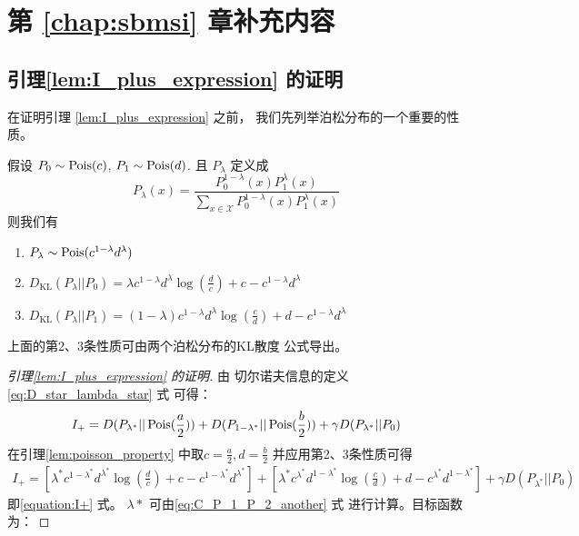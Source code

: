 \chapter{第 \ref{chap:sbmsi} 章补充内容}
\section{引理\ref{lem:I_plus_expression} 的证明}
在证明引理
\ref{lem:I_plus_expression}  之前，
我们先列举泊松分布的一个重要的性质。
\begin{lemma}\label{lem:poisson_property}
假设 $P_0 \sim \operatorname{Pois}(c)$, $P_1 \sim \operatorname{Pois}(d)$.
且 $P_{\lambda}$ 定义成
$$
P_{\lambda}(x) = \frac{P_0^{1-\lambda}(x) P_1^{\lambda} (x)}
{\sum_{x \in \mathcal{X}}P_0^{1-\lambda}(x) P_1^{\lambda} (x)}
$$
则我们有
\begin{enumerate}
    \item $P_{\lambda} \sim \operatorname{Pois}(c^{1-\lambda} d^{\lambda})$
    \item $D_{\mathrm{KL}}(P_{\lambda}||P_0) = 
    \lambda c^{1-\lambda}d^{\lambda}\log(\frac{d}{c}) + c-c^{1-\lambda}d^{\lambda}$
    \item $D_{\mathrm{KL}}(P_{\lambda}||P_1) = (1-\lambda)
    c^{1-\lambda}d^{\lambda}\log(\frac{c}{d})
    + d-c^{1-\lambda}d^{\lambda}$
\end{enumerate}
\end{lemma}
上面的第2、3条性质可由两个泊松分布的KL散度
公式导出。
\begin{proof}[引理\ref{lem:I_plus_expression} 的证明]
由 切尔诺夫信息的定义 \eqref{eq:D_star_lambda_star} 式
可得：
$$
I_+ = D(P_{\lambda^*} || \operatorname{Pois}(\frac{a}{2}))
+ D(P_{1-\lambda^*} || \operatorname{Pois}(\frac{b}{2}))
+ \gamma D(P_{\lambda^*} || P_0)
$$
在引理\ref{lem:poisson_property}
中取$c=\frac{a}{2}, d=\frac{b}{2}$
并应用第2、3条性质可得
\begin{align*}
    I_+ = \left[\lambda^* c^{1-\lambda^*}d^{\lambda^*}
    \log(\frac{d}{c})+ c-c^{1-\lambda^*}d^{\lambda^*}
    \right]
+ \left[\lambda^* c^{\lambda^*}d^{1-\lambda^*}\log(\frac{c}{d})
+ d - c^{\lambda^*}d^{1-\lambda^*}\right]
+ \gamma D(P_{\lambda^*} || P_0)
\end{align*}
即\eqref{equation:I+} 式。
$\lambda*$ 可由\eqref{eq:C_P_1_P_2_another} 式
进行计算。目标函数为：
\end{proof}